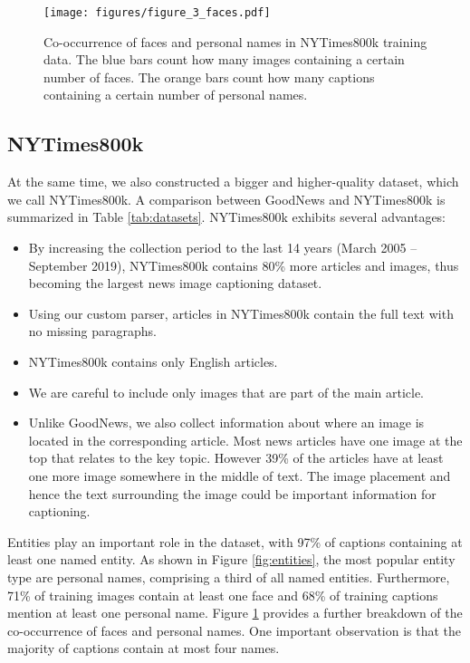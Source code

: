 \begin{figure}[t]
   \begin{center}
   \texttt{[image: figures/figure\_3\_faces.pdf]}
   \end{center}
      \caption{Co-occurrence of faces and personal names in NYTimes800k
               training data. The blue bars count how many images containing a
               certain number of faces. The orange bars count how many captions
               containing a certain number of personal names.}
   \label{fig:faces}
\end{figure}


\subsection{NYTimes800k}

At the same time, we also constructed a bigger and higher-quality dataset,
which we call NYTimes800k. A comparison between GoodNews and NYTimes800k is
summarized in Table \ref{tab:datasets}. NYTimes800k exhibits several
advantages:

\begin{itemize}
   \item By increasing the collection period to the last 14 years (March 2005
   -- September 2019), NYTimes800k contains 80\% more articles and images, thus
   becoming the largest news image captioning dataset.
   \item Using our custom parser, articles in NYTimes800k contain the full text
   with no missing paragraphs.
   \item NYTimes800k contains only English articles.
   \item We are careful to include only images that are part of the main
   article.
   \item Unlike GoodNews, we also collect information about where an image is
   located in the corresponding article. Most news articles have one image at
   the top that relates to the key topic. However 39\% of the articles have at
   least one more image somewhere in the middle of text. The image placement
   and hence the text surrounding the image could be important information for
   captioning.
\end{itemize}

Entities play an important role in the dataset, with 97\% of captions
containing at least one named entity. As shown in Figure \ref{fig:entities},
the most popular entity type are personal names, comprising a third of all
named entities. Furthermore, 71\% of training images contain at least one face
and 68\% of training captions mention at least one personal name. Figure
\ref{fig:faces} provides a further breakdown of the co-occurrence of faces and
personal names. One important observation is that the majority of captions
contain at most four names.


